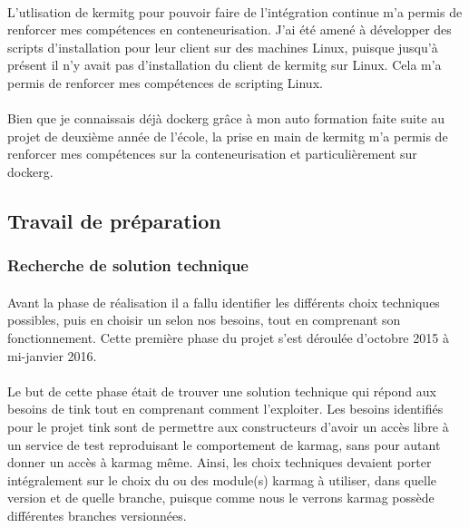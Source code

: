 \documentclass[12pt,a4paper]{report}
\begin{document}
\paragraph*{}L'utlisation de \gls{kermitg} pour pouvoir faire de l'intégration continue m'a permis de renforcer mes compétences en conteneurisation. J’ai été amené à
développer des scripts d’installation pour leur client sur des machines Linux, puisque
jusqu’à présent il n’y avait pas d’installation du client de \gls{kermitg} sur Linux. Cela m’a permis de renforcer mes compétences de scripting Linux.
\paragraph*{}Bien que je connaissais déjà \gls{dockerg} grâce à mon auto formation faite suite au projet de deuxième année de l’école, la prise en main de \gls{kermitg} m’a permis de renforcer mes compétences sur la conteneurisation et particulièrement sur \gls{dockerg}. \\
\subsection{Travail de préparation} 
\subsubsection{Recherche de solution technique}
\paragraph*{}Avant la phase de réalisation il a fallu identifier les différents choix techniques possibles, puis en choisir un selon nos besoins, tout en comprenant son fonctionnement. Cette première phase du projet s’est déroulée d’octobre 2015 à mi-janvier 2016.
\paragraph*{}Le but de cette phase était de trouver une solution technique qui répond
aux besoins de \gls{tink} tout en comprenant comment l’exploiter. Les besoins identifiés pour le projet \gls{tink} sont de permettre aux constructeurs d’avoir un accès libre à un service de test reproduisant le comportement de \gls{karmag}, sans pour autant donner un accès à \gls{karmag} même. Ainsi, les choix techniques devaient porter intégralement sur le choix du ou des module(s) \gls{karmag} à utiliser, dans quelle version et de quelle branche, puisque comme nous le verrons \gls{karmag} possède différentes branches versionnées.
\end{document}
